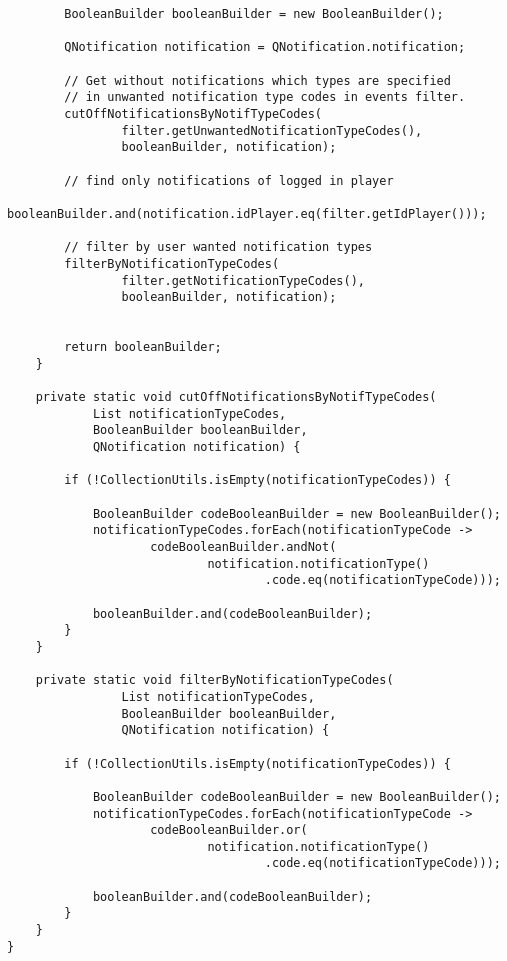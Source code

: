 \documentclass[twoside, 12pt]{article}
\begin{document}
{\begin{lstlisting}
        BooleanBuilder booleanBuilder = new BooleanBuilder();

        QNotification notification = QNotification.notification;

        // Get without notifications which types are specified
        // in unwanted notification type codes in events filter.
        cutOffNotificationsByNotifTypeCodes(
                filter.getUnwantedNotificationTypeCodes(),
                booleanBuilder, notification);

        // find only notifications of logged in player
        booleanBuilder.and(notification.idPlayer.eq(filter.getIdPlayer()));

        // filter by user wanted notification types
        filterByNotificationTypeCodes(
                filter.getNotificationTypeCodes(),
                booleanBuilder, notification);


        return booleanBuilder;
    }

    private static void cutOffNotificationsByNotifTypeCodes(
            List notificationTypeCodes,
            BooleanBuilder booleanBuilder,
            QNotification notification) {

        if (!CollectionUtils.isEmpty(notificationTypeCodes)) {

            BooleanBuilder codeBooleanBuilder = new BooleanBuilder();
            notificationTypeCodes.forEach(notificationTypeCode ->
                    codeBooleanBuilder.andNot(
                            notification.notificationType()
                                    .code.eq(notificationTypeCode)));

            booleanBuilder.and(codeBooleanBuilder);
        }
    }

    private static void filterByNotificationTypeCodes(
                List notificationTypeCodes,
                BooleanBuilder booleanBuilder,
                QNotification notification) {

        if (!CollectionUtils.isEmpty(notificationTypeCodes)) {

            BooleanBuilder codeBooleanBuilder = new BooleanBuilder();
            notificationTypeCodes.forEach(notificationTypeCode ->
                    codeBooleanBuilder.or(
                            notification.notificationType()
                                    .code.eq(notificationTypeCode)));

            booleanBuilder.and(codeBooleanBuilder);
        }
    }
}
\end{lstlisting}

}
\end{document}
